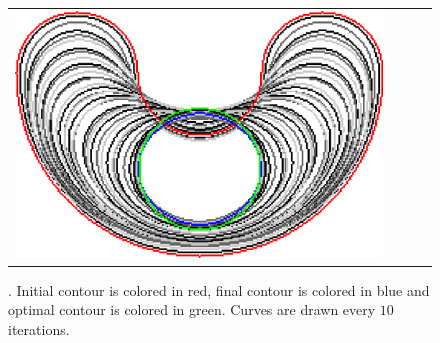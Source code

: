 \begin{figure}
\begin{tabular}{cccc}
\includegraphics[scale=0.18]{figures/chapter9/free-elastica/graphflow/bean/len_pen-0.01/radius-7/summary.pdf} 
\end{tabular}
\caption{. Initial contour is colored in red, final contour is colored in blue and optimal contour is colored in green. Curves are drawn every $10$ iterations.}
\label{ch9:fig:results-free-elastica-general}
\end{figure}

